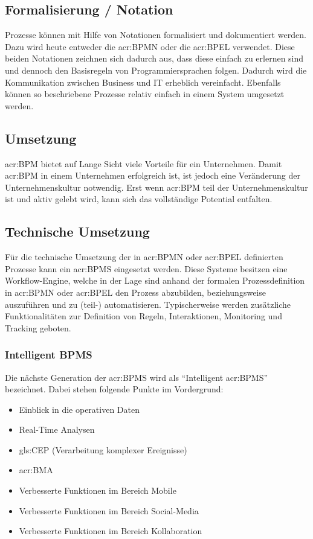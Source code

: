 \subsection{Formalisierung / Notation }
Prozesse können mit Hilfe von Notationen formalisiert und dokumentiert werden. Dazu wird heute entweder die \gls{acr:BPMN} oder die \gls{acr:BPEL} verwendet. Diese beiden Notationen zeichnen sich dadurch aus, dass diese einfach zu erlernen sind und dennoch den Basisregeln von Programmiersprachen folgen. Dadurch wird die Kommunikation zwischen Business und IT erheblich vereinfacht. Ebenfalls können so beschriebene Prozesse relativ einfach in einem System umgesetzt werden.

\subsection{Umsetzung}
\gls{acr:BPM} bietet auf Lange Sicht viele Vorteile für ein Unternehmen. Damit \gls{acr:BPM} in einem Unternehmen erfolgreich ist, ist jedoch eine Veränderung der Unternehmenskultur notwendig. Erst wenn \gls{acr:BPM} teil der Unternehmenskultur ist und aktiv gelebt wird, kann sich das vollständige Potential entfalten.

\subsection{Technische Umsetzung}
Für die technische Umsetzung der in \gls{acr:BPMN} oder \gls{acr:BPEL} definierten Prozesse kann ein \gls{acr:BPMS} eingesetzt werden. Diese Systeme besitzen eine Workflow-Engine, welche in der Lage sind anhand der formalen Prozessdefinition in \gls{acr:BPMN} oder \gls{acr:BPEL} den Prozess abzubilden, beziehungsweise auszuführen und zu (teil-) automatisieren. Typischerweise werden zusätzliche Funktionalitäten zur Definition von Regeln, Interaktionen, Monitoring und Tracking geboten.

\newpage
\subsubsection{Intelligent BPMS}
Die nächste Generation der \gls{acr:BPMS} wird als "`Intelligent \gls{acr:BPMS}"' bezeichnet. Dabei stehen folgende Punkte im Vordergrund:

\begin{itemize}
\item Einblick in die operativen Daten
\item Real-Time Analysen
\item \gls{gls:CEP} (Verarbeitung komplexer Ereignisse)
\item \gls{acr:BMA}
\item Verbesserte Funktionen im Bereich Mobile
\item Verbesserte Funktionen im Bereich Social-Media
\item Verbesserte Funktionen im Bereich Kollaboration
\end{itemize}
